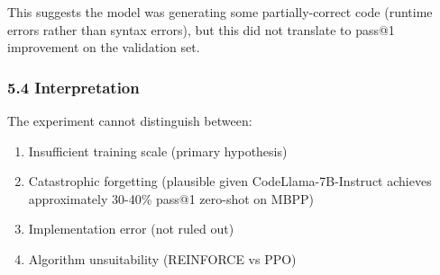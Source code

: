 This suggests the model was generating some partially-correct code (runtime errors rather than syntax errors), but this did not translate to pass@1 improvement on the validation set.

\subsubsection{5.4 Interpretation}

The experiment cannot distinguish between:
\begin{enumerate}
\item Insufficient training scale (primary hypothesis)
\item Catastrophic forgetting (plausible given CodeLlama-7B-Instruct achieves approximately 30-40\% pass@1 zero-shot on MBPP)
\item Implementation error (not ruled out)
\item Algorithm unsuitability (REINFORCE vs PPO)
\end{enumerate}
